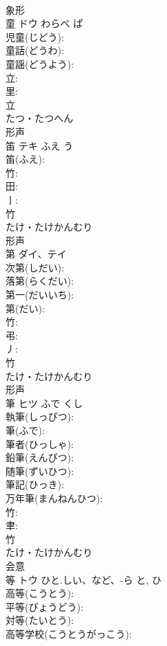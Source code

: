 \documentclass[8pt]{extreport}
\begin{document}
\begin{CJK}{UTF8}{min}
\\	象形 
\\	童	ドウ	わらべ	ぱ	
\\	児童(じどう): 
\\	童話(どうわ): 
\\	童謡(どうよう): 
\\	立: 
\\	里: 
\\	立	
\\	たつ・たつへん	
\\	形声 
\\	笛	テキ	ふえ	う	
\\	笛(ふえ): 
\\	竹: 
\\	田: 
\\	丨: 
\\	竹	
\\	たけ・たけかんむり	
\\	形声 
\\	第	ダイ、テイ			
\\	次第(しだい): 
\\	落第(らくだい): 
\\	第一(だいいち): 
\\	第(だい): 
\\	竹: 
\\	弔: 
\\	丿: 
\\	竹	
\\	たけ・たけかんむり	
\\	形声 
\\	筆	ヒツ	ふで	くし	
\\	執筆(しっぴつ): 
\\	筆(ふで): 
\\	筆者(ひっしゃ): 
\\	鉛筆(えんぴつ): 
\\	随筆(ずいひつ): 
\\	筆記(ひっき): 
\\	万年筆(まんねんひつ): 
\\	竹: 
\\	聿: 
\\	竹	
\\	たけ・たけかんむり	
\\	会意 
\\	等	トウ	ひと.しい、など、-ら	と, ひ	
\\	高等(こうとう): 
\\	平等(びょうどう): 
\\	対等(たいとう): 
\\	高等学校(こうとうがっこう): 

\end{CJK}
\end{document}
